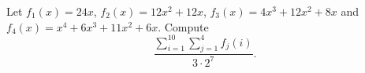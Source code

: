 Let $f_1(x)=24x$, $f_2(x)=12x^2+12x$, $f_3(x)=4x^3+12x^2+8x$ and $f_4(x)=x^4+6x^3+11x^2+6x$. Compute
\[\dfrac{\displaystyle\sum_{i=1}^{10}\sum_{j=1}^{4}f_j(i)}{3\cdot2^7}.\]
